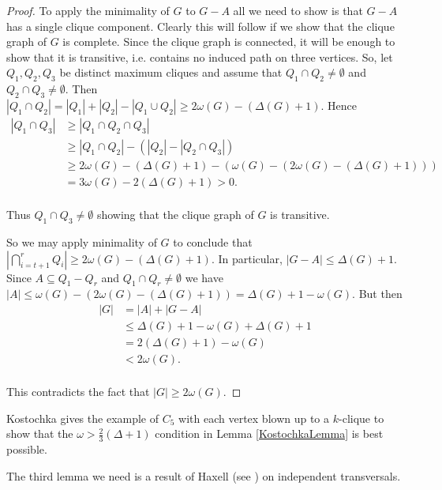 \documentclass[12pt]{article}
\theoremstyle{plain}
\theoremstyle{definition}
\theoremstyle{remark}
\begin{document}
\begin{proof}
To apply the minimality of $G$ to $G-A$ all we need to show is that $G-A$ has a single clique component.  Clearly this will follow if we show that the clique graph of $G$ is complete.  Since the clique graph is connected, it will be enough to show that it is transitive, i.e. contains no induced path on three vertices.  So, let $Q_1, Q_2, Q_3$ be distinct maximum cliques and assume that $Q_1 \cap Q_2 \neq \emptyset$ and $Q_2 \cap Q_3 \neq \emptyset$.  Then $|Q_1 \cap Q_2| = |Q_1| + |Q_2| - |Q_1 \cup Q_2| \geq 2\omega(G) - (\Delta(G) + 1)$.  Hence
\begin{align*}
|Q_1 \cap Q_3| &\geq |Q_1 \cap Q_2 \cap Q_3| \\
&\geq |Q_1 \cap Q_2| - (|Q_2| - |Q_2 \cap Q_3|) \\
&\geq 2\omega(G) - (\Delta(G) + 1) - (\omega(G) - (2\omega(G) - (\Delta(G) + 1))) \\
&= 3\omega(G) - 2(\Delta(G) + 1) > 0.\\
\end{align*}

Thus $Q_1 \cap Q_3 \neq \emptyset$ showing that the clique graph of $G$ is transitive.\newline

So we may apply minimality of $G$ to conclude that $\left |\displaystyle\bigcap_{i = t + 1}^r Q_i \right | \geq 2\omega(G) - (\Delta(G) + 1)$.  In particular, $|G-A| \leq \Delta(G) + 1$.  Since $A \subseteq Q_1 - Q_r$ and $Q_1 \cap Q_r \neq \emptyset$ we have $|A| \leq \omega(G) - (2\omega(G) - (\Delta(G) + 1)) = \Delta(G) + 1 - \omega(G)$. But then
\begin{align*}
|G| &= |A| + |G-A| \\
&\leq \Delta(G) + 1 - \omega(G) + \Delta(G) + 1 \\
&= 2(\Delta(G) + 1) - \omega(G) \\
&< 2\omega(G).\\
\end{align*}

This contradicts the fact that $|G| \geq 2\omega(G)$.
\end{proof}

Kostochka gives the example of $C_5$ with each vertex blown up to a $k$-clique to show that the $\omega > \frac{2}{3}(\Delta + 1)$ condition in Lemma \ref{KostochkaLemma} is best possible.\newline

The third lemma we need is a result of Haxell (see \cite{Haxell}) on independent transversals.
\end{document}
